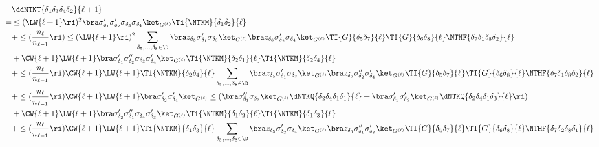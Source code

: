 \begin{align}\label{eq:T-recursion}\index{ddNTKs!statistics!T-recursion@$T$-recursion}
&\ddNTKT{\delta_1\delta_3\delta_4\delta_2}{\ell+1}\, \\
=&\le(\LW{\ell+1}\ri)^2\bra \sigma^{\prime}_{\delta_1} \sigma^{\prime}_{\delta_2} \sigma_{\delta_3}\sigma_{\delta_4}\ket_{G^{(\ell)}}\Ti{\NTKM}{\delta_1\delta_2}{\ell}\, \notag\\
&+\le(\frac{n_{\ell}}{n_{\ell-1}}\ri)\le(\LW{\ell+1}\ri)^2\sum_{\delta_5,\ldots,\delta_8\in\D}\bra z_{\delta_5}\sigma^{\prime}_{\delta_1} \sigma_{\delta_3}\ket_{G^{(\ell)}}\bra z_{\delta_6} \sigma^{\prime}_{\delta_2}\sigma_{\delta_4}\ket_{G^{(\ell)}}\TI{G}{\delta_5\delta_7}{\ell}\TI{G}{\delta_6\delta_8}{\ell}\NTHF{\delta_7\delta_1\delta_8\delta_2}{\ell}\, \notag\\
&+\CW{\ell+1}\LW{\ell+1}\bra \sigma^{\prime}_{\delta_1} \sigma^{\prime\prime}_{\delta_2} \sigma_{\delta_3}\sigma^{\prime}_{\delta_4}\ket_{G^{(\ell)}}\Ti{\NTKM}{\delta_2\delta_1}{\ell}\Ti{\NTKM}{\delta_2\delta_4}{\ell}\, \notag\\
&+\le(\frac{n_{\ell}}{n_{\ell-1}}\ri)\CW{\ell+1}\LW{\ell+1}\Ti{\NTKM}{\delta_2\delta_4}{\ell}\sum_{\delta_5,\ldots,\delta_8\in\D}\bra z_{\delta_5}\sigma^{\prime}_{\delta_1} \sigma_{\delta_3}\ket_{G^{(\ell)}}\bra z_{\delta_6} \sigma^{\prime\prime}_{\delta_2}\sigma^{\prime}_{\delta_4}\ket_{G^{(\ell)}}\TI{G}{\delta_5\delta_7}{\ell}\TI{G}{\delta_6\delta_8}{\ell}\NTHF{\delta_7\delta_1\delta_8\delta_2}{\ell}\, \notag\\
&+\le(\frac{n_{\ell}}{n_{\ell-1}}\ri)\CW{\ell+1}\LW{\ell+1}\bra  \sigma^{\prime}_{\delta_2}\sigma^{\prime}_{\delta_4}\ket_{G^{(\ell)}}\le(\bra  \sigma^{\prime\prime}_{\delta_1}\sigma_{\delta_3}\ket_{G^{(\ell)}}\dNTKQ{\delta_2\delta_4\delta_1\delta_1}{\ell}+\bra  \sigma^{\prime}_{\delta_1}\sigma^{\prime}_{\delta_3}\ket_{G^{(\ell)}}\dNTKQ{\delta_2\delta_4\delta_1\delta_3}{\ell}\ri)\, \notag\\
&+\CW{\ell+1}\LW{\ell+1}\bra \sigma^{\prime}_{\delta_2} \sigma^{\prime\prime}_{\delta_1} \sigma_{\delta_4}\sigma^{\prime}_{\delta_3}\ket_{G^{(\ell)}}\Ti{\NTKM}{\delta_1\delta_2}{\ell}\Ti{\NTKM}{\delta_1\delta_3}{\ell}\, \notag\\
&+\le(\frac{n_{\ell}}{n_{\ell-1}}\ri)\CW{\ell+1}\LW{\ell+1}\Ti{\NTKM}{\delta_1\delta_3}{\ell}\sum_{\delta_5,\ldots,\delta_8\in\D}\bra z_{\delta_5}\sigma^{\prime}_{\delta_2} \sigma_{\delta_4}\ket_{G^{(\ell)}}\bra z_{\delta_6} \sigma^{\prime\prime}_{\delta_1}\sigma^{\prime}_{\delta_3}\ket_{G^{(\ell)}}\TI{G}{\delta_5\delta_7}{\ell}\TI{G}{\delta_6\delta_8}{\ell}\NTHF{\delta_7\delta_2\delta_8\delta_1}{\ell}\, \notag\\

\end{align}
